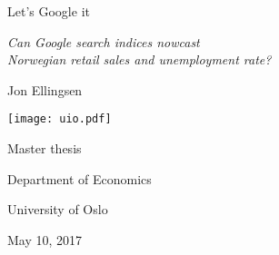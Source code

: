 \begin{titlepage}
\centering

{\Huge Let's Google it} \\

\vspace{0.5cm}

{\Large \textit{Can Google search indices nowcast \\
		Norwegian retail sales and unemployment rate?}} \\

\vspace{1cm}

{\large Jon Ellingsen}

\vspace{1cm}

\texttt{[image: uio.pdf]}

\vspace{1cm}

{\large Master thesis}

\vspace{0.5cm}

{\large Department of Economics}

\vspace{0.5cm}

{\large University of Oslo}

\vspace{1cm}

{\large May 10, 2017}

\end{titlepage}

\restoregeometry